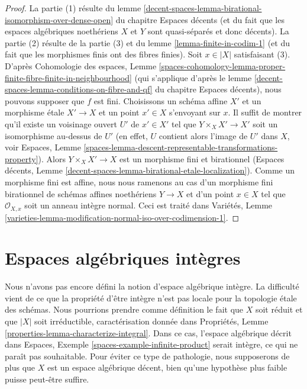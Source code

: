 \begin{proof}
La partie (1) résulte du lemme
\ref{decent-spaces-lemma-birational-isomorphism-over-dense-open} du chapitre Espaces décents
(et du fait que les espaces algébriques noethériens $X$ et $Y$
sont quasi-séparés et donc décents).
La partie (2) résulte de la partie (3) et du lemme \ref{lemma-finite-in-codim-1}
(et du fait que les morphismes finis ont des fibres finies).
Soit $x \in |X|$ satisfaisant (3). D'après
Cohomologie des espaces, Lemme
\ref{spaces-cohomology-lemma-proper-finite-fibre-finite-in-neighbourhood}
(qui s'applique d'après le lemme
\ref{decent-spaces-lemma-conditions-on-fibre-and-qf} du chapitre Espaces décents),
nous pouvons supposer que $f$ est fini. Choisissons un schéma affine $X'$ et
un morphisme \'etale $X' \to X$ et un point $x' \in X$ s'envoyant sur $x$.
Il suffit de montrer qu'il existe un voisinage ouvert $U'$ de $x' \in X'$
tel que $Y \times_X X' \to X'$ soit un isomorphisme au-dessus de $U'$
(en effet, $U$ contient alors l'image de $U'$ dans $X$, voir Espaces, Lemme
\ref{spaces-lemma-descent-representable-transformations-property}).
Alors $Y \times_X X' \to X$ est un morphisme fini et birationnel
(Espaces décents, Lemme \ref{decent-spaces-lemma-birational-etale-localization}).
Comme un morphisme fini est affine, nous nous ramenons
au cas d'un morphisme fini birationnel de schémas affines noethériens
$Y \to X$ et d'un point $x \in X$ tel que $\mathcal{O}_{X, x}$ soit un
anneau intègre normal. Ceci est traité dans Variétés, Lemme
\ref{varieties-lemma-modification-normal-iso-over-codimension-1}.
\end{proof}






\section{Espaces algébriques intègres}
\label{section-integral-spaces}

\noindent
Nous n'avons pas encore défini la notion d'espace algébrique intègre. La
difficulté vient de ce que la propriété d'être intègre n'est pas locale pour la topologie \'etale des schémas.
Nous pourrions prendre comme définition le fait que $X$ soit réduit et que $|X|$ soit irréductible,
caractérisation donnée dans Propriétés, Lemme \ref{properties-lemma-characterize-integral}.
Dans ce cas, l'espace algébrique
décrit dans Espaces, Exemple \ref{spaces-example-infinite-product}
serait intègre, ce qui ne paraît pas souhaitable.
Pour éviter ce type de pathologie, nous supposerons de plus que $X$ est
un espace algébrique décent, bien qu'une hypothèse plus faible puisse peut-être suffire.

